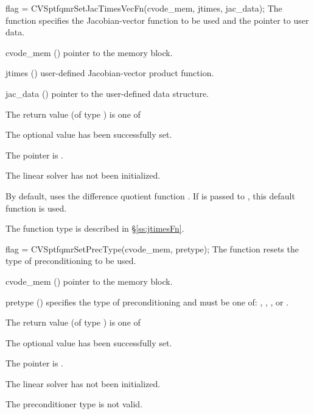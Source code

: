 {
  flag = CVSptfqmrSetJacTimesVecFn(cvode\_mem, jtimes, jac\_data);
}
{
  The function  specifies the Jacobian-vector 
  function to be used and the pointer to user data.
}
{
  \begin{args}
  \item[cvode\_mem] ()
    pointer to the {\cvodes} memory block.
  \item[jtimes] ()
    user-defined Jacobian-vector product function.
  \item[jac\_data] ()
     pointer to the user-defined data structure.
  \end{args}
}
{
  The return value  (of type ) is one of
  \begin{args}
  \item[\Id{CVSPTFQMR\_SUCCESS}] 
    The optional value has been successfully set.
  \item[\Id{CVSPTFQMR\_MEM\_NULL}]
    The  pointer is .
  \item[\Id{CVSPTFQMR\_LMEM\_NULL}]
    The {\cvsptfqmr} linear solver has not been initialized.
  \end{args}
}
{
  By default, {\cvsptfqmr} uses the difference quotient function .
  If  is passed to , this default function is used.

  The function type  is described in \S\ref{ss:jtimesFn}.
}
{
  flag = CVSptfqmrSetPrecType(cvode\_mem, pretype);
}
{
  The function  resets the type
  of preconditioning to be used.
}
{
  \begin{args}
  \item[cvode\_mem] ()
    pointer to the {\cvodes} memory block.
  \item[pretype] ()
    specifies the type of preconditioning and must be one of:
    , , , or .
  \end{args}
}
{
  The return value  (of type ) is one of
  \begin{args}
  \item[\Id{CVSPTFQMR\_SUCCESS}] 
    The optional value has been successfully set.
  \item[\Id{CVSPTFQMR\_MEM\_NULL}]
    The  pointer is .
  \item[\Id{CVSPTFQMR\_LMEM\_NULL}]
    The {\cvsptfqmr} linear solver has not been initialized.
  \item[\Id{CVSPTFQMR\_ILL\_INPUT}]
    The preconditioner type  is not valid.
  \end{args}
}
